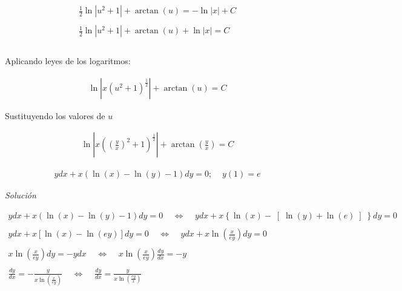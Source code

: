 \begin{equation*}
    \begin{gathered}
        \frac{1}{2}\ln\left|u^{2}+1\right|+\arctan(u)=-\ln\left|x\right|+C\\\\
        \frac{1}{2}\ln\left|u^{2}+1\right|+\arctan(u)+\ln\left|x\right|=C\\\\
    \end{gathered}
\end{equation*}

Aplicando leyes de los logaritmos:

\begin{equation*}
    \begin{gathered}
        \ln\left|x\left(u^{2}+1\right)^{\frac{1}{2}}\right|+\arctan(u)=C
    \end{gathered}
\end{equation*}

Sustituyendo los valores de \(\displaystyle u\)

\begin{equation*}
    \begin{gathered}
        \ln\left|x\left(\left(\frac{y}{x}\right)^{2}+1\right)^{\frac{1}{2}}\right|+\arctan\left(\frac{y}{x}\right)=C
    \end{gathered}
\end{equation*}

\vspace{1cm}
\begin{equation}
    \begin{gathered}
        ydx+x\left(\ln(x)-\ln(y)-1\right)dy=0;\;\;\;\;y(1)=e
    \end{gathered}
\end{equation}

\textit{Solución}

\begin{equation*}
    \begin{gathered}
        ydx+x(\ln(x)-\ln(y)-1)dy=0\;\;\;\;\Leftrightarrow\;\;\;\;ydx+x\left\{\ln(x)-\right[\ln(y)+\ln(e)\left]\right\}dy=0\\\\
        ydx+x\left[\ln(x)-\ln(ey)\right]dy=0\;\;\;\;\Leftrightarrow\;\;\;\;ydx+x\ln\left(\frac{x}{ey}\right)dy=0\\\\
        x\ln\left(\frac{x}{ey}\right)dy=-ydx\;\;\;\;\Leftrightarrow\;\;\;\;x\ln\left(\frac{x}{ey}\right)\frac{dy}{dx}=-y\\\\
        \frac{dy}{dx}=-\frac{y}{x\ln\left(\frac{x}{ey}\right)}\;\;\;\;\Leftrightarrow\;\;\;\;\frac{dy}{dx}=\frac{y}{x\ln\left(\frac{ey}{x}\right)}
    \end{gathered}
\end{equation*}

